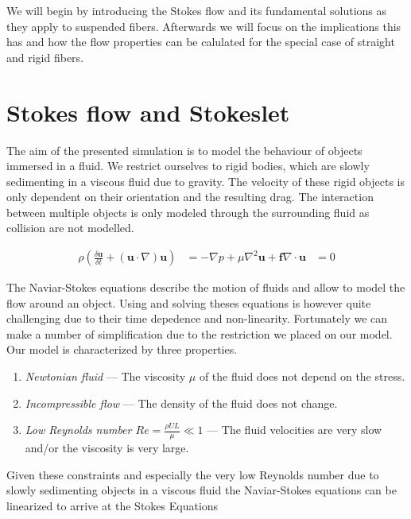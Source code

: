 \documentclass[a4paper,11pt]{kth-mag}
\begin{document}
We will begin by introducing the Stokes flow and its fundamental solutions as they apply to suspended fibers. Afterwards we will focus on the implications this has and how the flow properties can be calulated for the special case of straight and rigid fibers.

\section{Stokes flow and Stokeslet}

The aim of the presented simulation is to model the behaviour of objects immersed in a fluid. We restrict ourselves to rigid bodies, which are slowly sedimenting in a viscous fluid due to gravity. The velocity of these rigid objects is only dependent on their orientation and the resulting drag. The interaction between multiple objects is only modeled through the surrounding fluid as collision are not modelled.

\begin{equation}
  \label{eq:naviar_stokes_equations}
  \begin{aligned}
    \rho(\frac{\delta \mathbf{u}}{\delta t} + (\mathbf{u} \cdot \nabla)\mathbf{u}) &= -\nabla p + \mu\nabla^2\mathbf{u} + \mathbf{f}
    \nabla \cdot \mathbf{u} &= 0
  \end{aligned}
\end{equation}

The Naviar-Stokes equations describe the motion of fluids and allow to model the flow around an object. Using and solving theses equations is however quite challenging due to their time depedence and non-linearity. Fortunately we can make a number of simplification due to the restriction we placed on our model. Our model is characterized by three properties.

\begin{enumerate}
  \item{\textit{Newtonian fluid} — The viscosity $\mu$ of the fluid does not depend on the stress.}
  \item{\textit{Incompressible flow} — The density of the fluid does not change.}
  \item{\textit{Low Reynolds number $Re = \frac{\rho U L}{\mu} \ll 1$} — The fluid velocities are very slow and/or the viscosity is very large.}
\end{enumerate}

Given these constraints and especially the very low Reynolds number due to slowly sedimenting objects in a viscous fluid the Naviar-Stokes equations can be linearized to arrive at the Stokes Equations
\end{document}

